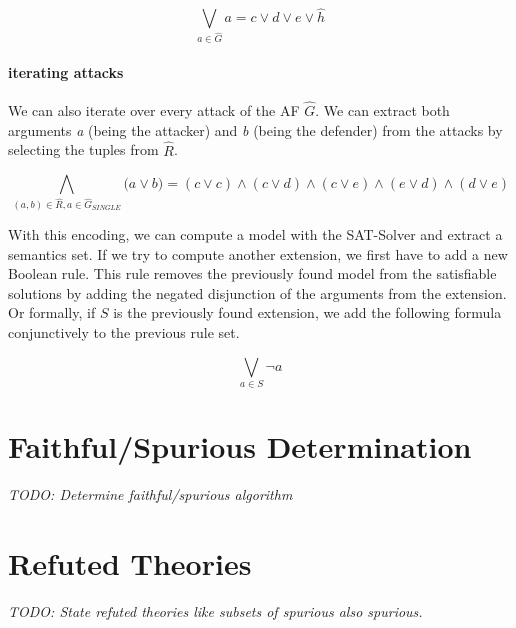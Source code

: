 \begin{example}
$$
\bigvee_{a \in \hat{G}} a = c \lor d \lor e \lor \hat{h}
$$

\paragraph{iterating attacks} We can also iterate over every attack of the AF $\hat{G}$. We can extract both arguments \emph{a} (being the attacker) and \emph{b} (being the defender) from the attacks by selecting the tuples from \emph{$\hat{R}$}.

$$
\bigwedge_{(a, b) \in \hat{R}, a\in \hat{G}_{\!S\!I\!N\!G\!L\!E}} \big( a \lor b \big) = (c \lor c) \land
(c \lor d) \land (c \lor e) \land (e \lor d) \land (d \lor e)
$$
\end{example}

With this encoding, we can compute a model with the SAT-Solver and extract a semantics set. If we try to compute another extension, we first have to add a new Boolean rule. This rule removes the previously found model from the satisfiable solutions by adding the negated disjunction of the arguments from the extension. Or formally, if $S$ is the previously found extension, we add the following formula conjunctively to the previous rule set.

$$
\bigvee_{a \in S} \lnot a
$$


\section{Faithful/Spurious Determination}
\label{sec:ImplementationsFaithfulSpuriousDetermination}
\textit{TODO: Determine faithful/spurious algorithm}

\section{Refuted Theories}
\label{sec:ImplementationsRefutedTheories}
\textit{TODO: State refuted theories like subsets of spurious also spurious.}




